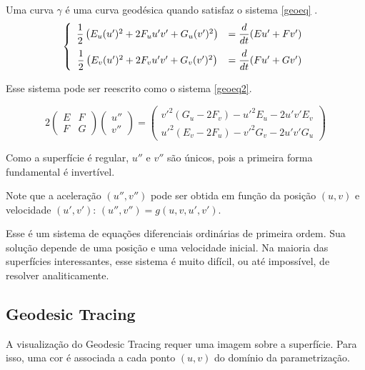 Uma curva $\gamma$ é uma curva geodésica quando satisfaz o sistema \ref{geoeq} \cite{GeomDiff:1}.
\begin{equation}
\label{geoeq}
    \left\{\begin{array}{cc}
        \dfrac{1}{2}\left(E_u(u')^2 + 2F_uu'v' + G_u(v')^2\right) & = \dfrac{d}{dt}(Eu' + Fv') \vspace{6pt}\\
        \dfrac{1}{2}\left(E_v(u')^2 + 2F_vu'v' + G_v(v')^2\right) & = \dfrac{d}{dt}(Fu' + Gv')
    \end{array}\right.
\end{equation}

Esse sistema pode ser reescrito como o sistema \ref{geoeq2}.

\begin{equation}
\label{geoeq2}
        2
        \begin{pmatrix}
            E & F \\
            F & G
        \end{pmatrix}
        \begin{pmatrix}
            u'' \\
            v''
        \end{pmatrix}
        =
        \begin{pmatrix}
            v'^2(G_u-2F_v)-u'^2E_u-2u'v'E_v \\
            u'^2(E_v-2F_u)-v'^2G_v-2u'v'G_u
        \end{pmatrix}
\end{equation}

Como a superfície é regular, $u''$ e $v''$ são únicos, pois a primeira forma
fundamental é invertível.

Note que a aceleração $(u'', v'')$ pode ser obtida em função da posição $(u,v)$
e velocidade $(u', v')$: $(u'', v'') = g(u, v, u', v')$.

Esse é um sistema de equações diferenciais ordinárias de primeira ordem.
Sua solução depende de uma posição e uma velocidade inicial.
Na maioria das superfícies interessantes, esse sistema é muito difícil, ou até impossível,
de resolver analiticamente.

\subsection{Geodesic Tracing}
A visualização do Geodesic Tracing requer uma imagem sobre a superfície.
Para isso, uma cor é associada a cada ponto $(u,v)$ do domínio da parametrização.

